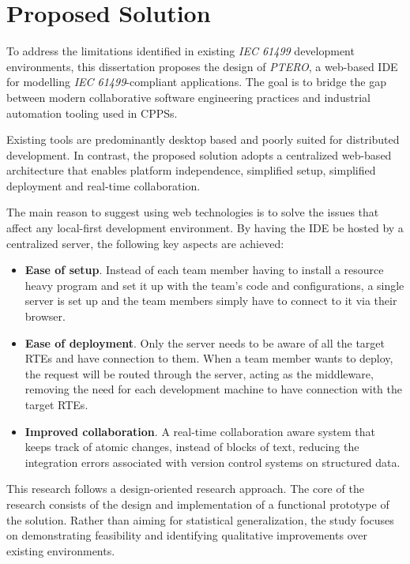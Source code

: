 \chapter{Proposed Solution} \label{chap:proposed-solution}
To address the limitations identified in existing \textit{IEC 61499} development environments, this dissertation proposes the design of \textit{PTERO}, a web-based \ac{IDE} for modelling \textit{IEC 61499}-compliant applications. The goal is to bridge the gap between modern collaborative software engineering practices and industrial automation tooling used in \acp{CPPS}.

Existing tools are predominantly desktop based and poorly suited for distributed development. In contrast, the proposed solution adopts a centralized web-based architecture that enables platform independence, simplified setup, simplified deployment and real-time collaboration.

The main reason to suggest using web technologies is to solve the issues that affect any local-first development environment. By having the \ac{IDE} be hosted by a centralized server, the following key aspects are achieved:

\begin{itemize}
  \item \textbf{Ease of setup}. Instead of each team member having to install a resource heavy program and set it up with the team's code and configurations, a single server is set up and the team members simply have to connect to it via their browser.

  \item \textbf{Ease of deployment}. Only the server needs to be aware of all the target \acp{RTE} and have connection to them. When a team member wants to deploy, the request will be routed through the server, acting as the middleware, removing the need for each development machine to have connection with the target \acp{RTE}.

  \item \textbf{Improved collaboration}. A real-time collaboration aware system that keeps track of atomic changes, instead of blocks of text, reducing the integration errors associated with version control systems on structured data.
\end{itemize}

This research follows a design-oriented research approach. The core of the research consists of the design and implementation of a functional prototype of the solution. Rather than aiming for statistical generalization, the study focuses on demonstrating feasibility and identifying qualitative improvements over existing environments.

